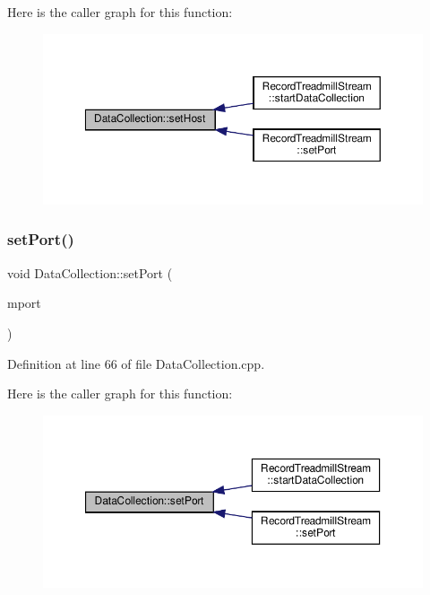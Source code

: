 Here is the caller graph for this function\+:
\nopagebreak
\begin{figure}[H]
\begin{center}
\leavevmode
\includegraphics[width=350pt]{class_data_collection_a9edfa021943d2cb01774ea5e2dfaa624_icgraph}
\end{center}
\end{figure}
\mbox{\label{class_data_collection_a6b3dc486f708a17e53df082dbe15c9eb}} 
\subsubsection{\texorpdfstring{set\+Port()}{setPort()}}
{\footnotesize\ttfamily void Data\+Collection\+::set\+Port (\begin{DoxyParamCaption}\item[{Q\+String}]{mport }\end{DoxyParamCaption})}



Definition at line 66 of file Data\+Collection.\+cpp.

Here is the caller graph for this function\+:
\nopagebreak
\begin{figure}[H]
\begin{center}
\leavevmode
\includegraphics[width=350pt]{class_data_collection_a6b3dc486f708a17e53df082dbe15c9eb_icgraph}
\end{center}
\end{figure}
\mbox{\label{class_data_collection_a552bd8c19edeb3bed687a1ee8066ac4a}} 
